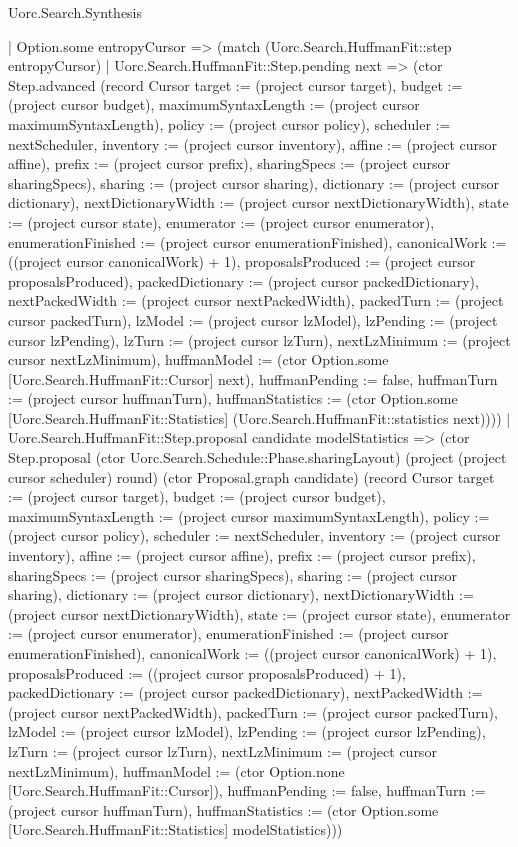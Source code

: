 \begin{lexlean}{Uorc.Search.Synthesis}
\begin{semanticmodule}
{    | Option.some entropyCursor => (match (Uorc.Search.HuffmanFit::step entropyCursor)
      | Uorc.Search.HuffmanFit::Step.pending next => (ctor Step.advanced (record Cursor {target := (project cursor target), budget := (project cursor budget), maximumSyntaxLength := (project cursor maximumSyntaxLength), policy := (project cursor policy), scheduler := nextScheduler, inventory := (project cursor inventory), affine := (project cursor affine), prefix := (project cursor prefix), sharingSpecs := (project cursor sharingSpecs), sharing := (project cursor sharing), dictionary := (project cursor dictionary), nextDictionaryWidth := (project cursor nextDictionaryWidth), state := (project cursor state), enumerator := (project cursor enumerator), enumerationFinished := (project cursor enumerationFinished), canonicalWork := ((project cursor canonicalWork) + 1), proposalsProduced := (project cursor proposalsProduced), packedDictionary := (project cursor packedDictionary), nextPackedWidth := (project cursor nextPackedWidth), packedTurn := (project cursor packedTurn), lzModel := (project cursor lzModel), lzPending := (project cursor lzPending), lzTurn := (project cursor lzTurn), nextLzMinimum := (project cursor nextLzMinimum), huffmanModel := (ctor Option.some [Uorc.Search.HuffmanFit::Cursor] next), huffmanPending := false, huffmanTurn := (project cursor huffmanTurn), huffmanStatistics := (ctor Option.some [Uorc.Search.HuffmanFit::Statistics] (Uorc.Search.HuffmanFit::statistics next))}))
      | Uorc.Search.HuffmanFit::Step.proposal candidate modelStatistics => (ctor Step.proposal (ctor Uorc.Search.Schedule::Phase.sharingLayout) (project (project cursor scheduler) round) (ctor Proposal.graph candidate) (record Cursor {target := (project cursor target), budget := (project cursor budget), maximumSyntaxLength := (project cursor maximumSyntaxLength), policy := (project cursor policy), scheduler := nextScheduler, inventory := (project cursor inventory), affine := (project cursor affine), prefix := (project cursor prefix), sharingSpecs := (project cursor sharingSpecs), sharing := (project cursor sharing), dictionary := (project cursor dictionary), nextDictionaryWidth := (project cursor nextDictionaryWidth), state := (project cursor state), enumerator := (project cursor enumerator), enumerationFinished := (project cursor enumerationFinished), canonicalWork := ((project cursor canonicalWork) + 1), proposalsProduced := ((project cursor proposalsProduced) + 1), packedDictionary := (project cursor packedDictionary), nextPackedWidth := (project cursor nextPackedWidth), packedTurn := (project cursor packedTurn), lzModel := (project cursor lzModel), lzPending := (project cursor lzPending), lzTurn := (project cursor lzTurn), nextLzMinimum := (project cursor nextLzMinimum), huffmanModel := (ctor Option.none [Uorc.Search.HuffmanFit::Cursor]), huffmanPending := false, huffmanTurn := (project cursor huffmanTurn), huffmanStatistics := (ctor Option.some [Uorc.Search.HuffmanFit::Statistics] modelStatistics)}))
}
\end{semanticmodule}
\end{lexlean}
